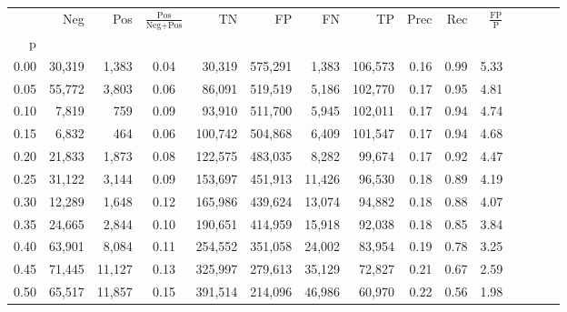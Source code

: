\begin{tabular}{rrrcrrrrrrrrrrr}
\toprule
{} &     Neg &     Pos & $\frac{\text{Pos}}{\text{Neg}+\text{Pos}}$ &       TN &       FP &       FN &       TP &  Prec &   Rec & $\frac{\text{FP}}{\text{P}}$ \\
p    &         &         &                                            &          &          &          &          &       &       &                              \\
\midrule
0.00 &  30,319 &   1,383 &                                       0.04 &   30,319 &  575,291 &    1,383 &  106,573 &  0.16 &  0.99 &                         5.33 \\
0.05 &  55,772 &   3,803 &                                       0.06 &   86,091 &  519,519 &    5,186 &  102,770 &  0.17 &  0.95 &                         4.81 \\
0.10 &   7,819 &     759 &                                       0.09 &   93,910 &  511,700 &    5,945 &  102,011 &  0.17 &  0.94 &                         4.74 \\
0.15 &   6,832 &     464 &                                       0.06 &  100,742 &  504,868 &    6,409 &  101,547 &  0.17 &  0.94 &                         4.68 \\
0.20 &  21,833 &   1,873 &                                       0.08 &  122,575 &  483,035 &    8,282 &   99,674 &  0.17 &  0.92 &                         4.47 \\
0.25 &  31,122 &   3,144 &                                       0.09 &  153,697 &  451,913 &   11,426 &   96,530 &  0.18 &  0.89 &                         4.19 \\
0.30 &  12,289 &   1,648 &                                       0.12 &  165,986 &  439,624 &   13,074 &   94,882 &  0.18 &  0.88 &                         4.07 \\
0.35 &  24,665 &   2,844 &                                       0.10 &  190,651 &  414,959 &   15,918 &   92,038 &  0.18 &  0.85 &                         3.84 \\
0.40 &  63,901 &   8,084 &                                       0.11 &  254,552 &  351,058 &   24,002 &   83,954 &  0.19 &  0.78 &                         3.25 \\
0.45 &  71,445 &  11,127 &                                       0.13 &  325,997 &  279,613 &   35,129 &   72,827 &  0.21 &  0.67 &                         2.59 \\
0.50 &  65,517 &  11,857 &                                       0.15 &  391,514 &  214,096 &   46,986 &   60,970 &  0.22 &  0.56 &                         1.98 \\

\end{tabular}
